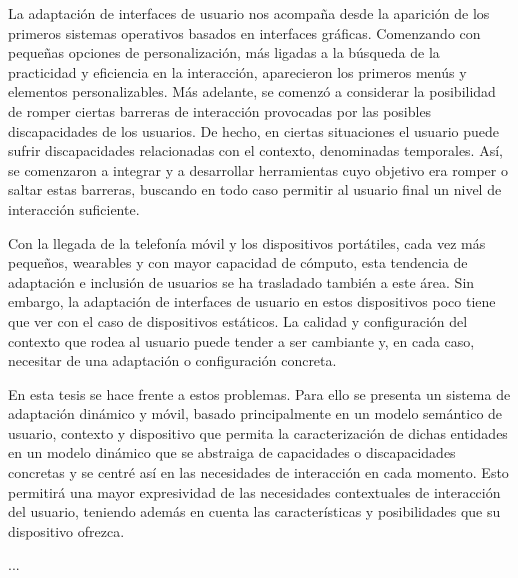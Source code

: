 \begin{resumen} %

La adaptación de interfaces de usuario nos acompaña desde la aparición de los
primeros sistemas operativos basados en interfaces gráficas. Comenzando con
pequeñas opciones de personalización, más ligadas a la búsqueda de la practicidad
y eficiencia en la interacción, aparecieron los primeros menús y elementos
personalizables. Más adelante, se comenzó a considerar la posibilidad de romper
ciertas barreras de interacción provocadas por las posibles discapacidades de
los usuarios. De hecho, en ciertas situaciones el usuario puede sufrir 
discapacidades relacionadas con el contexto, denominadas temporales.  Así, 
se comenzaron a integrar y a desarrollar herramientas cuyo objetivo era romper 
o saltar estas barreras, buscando en todo caso permitir al usuario final un nivel 
de interacción suficiente.

Con la llegada de la telefonía móvil y los dispositivos portátiles, cada vez
más pequeños, wearables y con mayor capacidad de cómputo, esta tendencia de 
adaptación e inclusión de usuarios se ha trasladado también a este área. Sin
embargo, la adaptación de interfaces de usuario en estos dispositivos poco
tiene que ver con el caso de dispositivos estáticos. La calidad y configuración
del contexto que rodea al usuario puede tender a ser cambiante y, en cada caso,
necesitar de una adaptación o configuración concreta.

En esta tesis se hace frente a estos problemas. Para ello se presenta un sistema
de adaptación dinámico y móvil, basado principalmente en un modelo semántico de
usuario, contexto y dispositivo que permita la caracterización de dichas
entidades en un modelo dinámico que se abstraiga de capacidades o discapacidades
concretas y se centré así en las necesidades de interacción en cada momento.
Esto permitirá una mayor expresividad de las necesidades contextuales de
interacción del usuario, teniendo además en cuenta las características y
posibilidades que su dispositivo ofrezca.


\end{resumen}


\begin{laburpena}        %


...




\end{laburpena}




